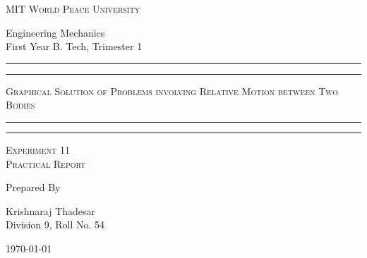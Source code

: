 \documentclass[11pt]{article}
\begin{document}
	
	\begin{titlepage} 
		\centering 
		
		
		\huge\textsc{
			MIT World Peace University
		}\\
	
		\vspace{0.75\baselineskip} %
		
		\LARGE{
			Engineering Mechanics\\
			First Year B. Tech, Trimester 1
		}
	
		
		\vfill %
		
		
		\rule{\textwidth}{1.6pt}\vspace*{-\baselineskip}\vspace*{2pt}
		\rule{\textwidth}{0.6pt}
		\vspace{0.75\baselineskip} %
		
		
		
		\huge{\textsc{
				Graphical Solution of Problems involving Relative Motion between Two Bodies
			}} \\
		
		
		
		\vspace{0.5\baselineskip} %
		\rule{\textwidth}{0.6pt}\vspace*{-\baselineskip}\vspace*{2.8pt}
		\rule{\textwidth}{1.6pt}
		
		\vspace{1\baselineskip} %

			
		\LARGE\textsc{
			Experiment 11\\
			Practical Report
		} %
		\vfill
		
		
		Prepared By
		\vspace{0.5\baselineskip} %
		
		\Large{
			Krishnaraj Thadesar \\
			Division 9, Roll No. 54
		}
		
		
		\vspace{0.5\baselineskip} %
		\today

	\end{titlepage}
	
\end{document}
